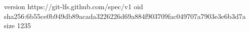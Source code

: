 version https://git-lfs.github.com/spec/v1
oid sha256:6b55ce0b949db89acada3226226d69a884f903709fac049707a7903e3e6b3d7a
size 1235
